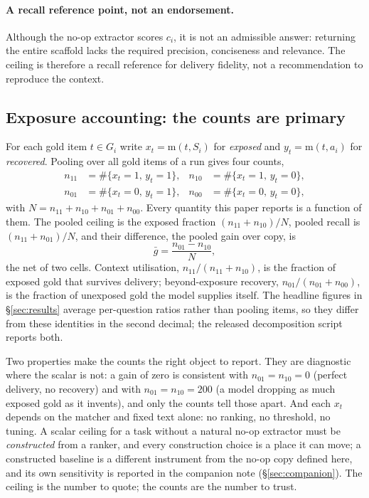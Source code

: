 \documentclass[10pt,twocolumn]{article}
\begin{document}
\paragraph{A recall reference point, not an endorsement.} Although the no-op extractor scores $c_i$, it is not an admissible answer: returning the entire scaffold lacks the required precision, conciseness and relevance. The ceiling is therefore a recall reference for delivery fidelity, not a recommendation to reproduce the context.

\subsection{Exposure accounting: the counts are primary}\label{sec:accounting}
For each gold item $t\in G_i$ write $x_t=\mathrm{m}(t,S_i)$ for \emph{exposed} and $y_t=\mathrm{m}(t,a_i)$ for \emph{recovered}. Pooling over all gold items of a run gives four counts,
\[
\begin{aligned}
  n_{11}&=\#\{x_t{=}1,\,y_t{=}1\}, & n_{10}&=\#\{x_t{=}1,\,y_t{=}0\},\\
  n_{01}&=\#\{x_t{=}0,\,y_t{=}1\}, & n_{00}&=\#\{x_t{=}0,\,y_t{=}0\},
\end{aligned}
\]
with $N=n_{11}+n_{10}+n_{01}+n_{00}$. Every quantity this paper reports is a function of them. The pooled ceiling is the exposed fraction $(n_{11}+n_{10})/N$, pooled recall is $(n_{11}+n_{01})/N$, and their difference, the pooled gain over copy, is
\[
  \bar g=\frac{n_{01}-n_{10}}{N},
\]
the net of two cells. Context utilisation, $n_{11}/(n_{11}+n_{10})$, is the fraction of exposed gold that survives delivery; beyond-exposure recovery, $n_{01}/(n_{01}+n_{00})$, is the fraction of unexposed gold the model supplies itself. The headline figures in \S\ref{sec:results} average per-question ratios rather than pooling items, so they differ from these identities in the second decimal; the released decomposition script reports both.

Two properties make the counts the right object to report. They are diagnostic where the scalar is not: a gain of zero is consistent with $n_{01}=n_{10}=0$ (perfect delivery, no recovery) and with $n_{01}=n_{10}=200$ (a model dropping as much exposed gold as it invents), and only the counts tell those apart. And each $x_t$ depends on the matcher and fixed text alone: no ranking, no threshold, no tuning. A scalar ceiling for a task without a natural no-op extractor must be \emph{constructed} from a ranker, and every construction choice is a place it can move; a constructed baseline is a different instrument from the no-op copy defined here, and its own sensitivity is reported in the companion note (\S\ref{sec:companion}). The ceiling is the number to quote; the counts are the number to trust.
\end{document}
